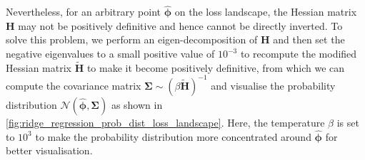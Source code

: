 Nevertheless, for an arbitrary point $\hat{\boldsymbol{\phi}}$ on the loss landscape, the Hessian matrix $\bm{H}$ may not be positively definitive and hence cannot be directly inverted. To solve this problem, we perform an eigen-decomposition of $\bm{H}$ and then set the negative eigenvalues to a small positive value of $10^{-3}$ to recompute the modified Hessian matrix $\tilde{\bm{H}}$ to make it become positively definitive, from which we can compute the covariance matrix $\boldsymbol{\Sigma}\sim(\beta\tilde{\bm{H}})^{-1}$ and visualise the probability distribution $\mathcal{N}(\hat{\boldsymbol{\phi}},\boldsymbol{\Sigma})$ as shown in \cref{fig:ridge_regression_prob_dist_loss_landscape}. Here, the temperature $\beta$ is set to $10^{3}$ to make the probability distribution more concentrated around $\hat{\boldsymbol{\phi}}$ for better visualisation.
